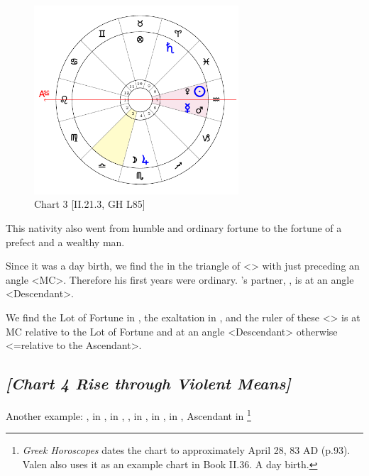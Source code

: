 \clearpage
\begin{figure}
\centering
\includegraphics[width=0.68\textwidth]{charts/2_21_3}
\caption{Chart 3 [II.21.3, GH L85]}
\label{fig:chart03}
\end{figure}

This nativity also went from humble and ordinary fortune to the fortune of a prefect and a wealthy man. 

Since it was a day birth, we find the \Sun\xspace in the triangle of \Saturn\xspace <\Aquarius\xspace \Gemini\xspace \Libra> with \Saturn\xspace just preceding an angle <MC>. Therefore his first years were ordinary. \Saturn’s partner, \Mercury, is at an angle <Descendant>. 

We find the Lot of Fortune in \Taurus, the exaltation in \Libra, and the ruler of these <\Venus> is at MC relative to the Lot of Fortune and at an angle <Descendant> otherwise <=relative to the Ascendant>.
\newpage
\subsection*{\textit{[Chart 4 Rise through Violent Means]}}

Another example: \Sun, \Mercury\xspace in \Taurus, \Moon\xspace in \Aquarius, \Saturn, \Venus\xspace in \Aries, \Jupiter\xspace in \Virgo, \Mars\xspace in \Pisces, Ascendant in \Leo
\footnote{\textit{Greek Horoscopes} dates the chart to approximately April 28, 83 AD (p.93). Valen also uses it as an example chart in Book II.36. A day birth.}

